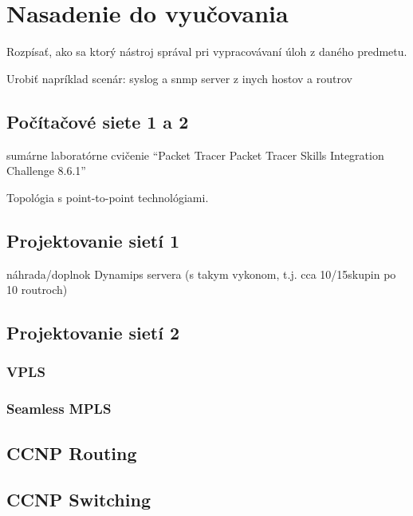 \chapter{Nasadenie do vyučovania}

Rozpísať, ako sa ktorý nástroj správal pri vypracovávaní úloh z daného predmetu.

Urobiť napríklad scenár: syslog a snmp server z inych hostov a routrov

\section{Počítačové siete 1 a 2}

sumárne laboratórne cvičenie “Packet Tracer Packet Tracer Skills Integration Challenge 8.6.1”

Topológia s point-to-point technológiami.

\section{Projektovanie sietí 1}

náhrada/doplnok Dynamips servera (s takym vykonom, t.j. cca 10/15skupin po 10 routroch)

\section{Projektovanie sietí 2}

\subsection{VPLS}

\subsection{Seamless MPLS}

\section{CCNP Routing}

\section{CCNP Switching}
